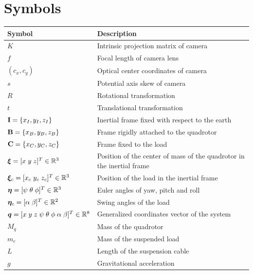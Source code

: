 \chapter*{Symbols}

\begin{table}[H]
    \centering
    \begin{tabular}{@{}p{}p{}@{}}
        \hline
        \textbf{Symbol} & \textbf{Description} \\
        \hline
        $K$ & Intrinsic projection matrix of camera \\
        $f$ & Focal length of camera lens \\
        $(c_x, c_y)$ & Optical center coordinates of camera \\
        $s$ & Potential axis skew of camera \\
        $R$ & Rotational transformation \\
        $t$ & Translational transformation \\       
        $\mathbf{I} = \{x_I, y_I, z_I\}$ & Inertial frame fixed with respect to the earth \\
        $\mathbf{B} = \{x_B, y_B, z_B\}$ & Frame rigidly attached to the quadrotor \\
        $\mathbf{C} = \{x_C, y_C, z_C\}$ & Frame fixed to the load \\
        $\boldsymbol{\xi} = [x \; y \; z]^T \in \mathbb{R}^3$ & Position of the center of mass of the quadrotor in the inertial frame \\
        $\boldsymbol{\xi}_c = [x_c \; y_c \; z_c]^T \in \mathbb{R}^3$ & Position of the load in the inertial frame \\
        $\boldsymbol{\eta} = [\psi \; \theta \; \phi]^T \in \mathbb{R}^3$ & Euler angles of yaw, pitch and roll \\
        $\boldsymbol{\eta}_c = [\alpha \; \beta]^T \in \mathbb{R}^2$ & Swing angles of the load \\
        $\boldsymbol{q} = [x \; y \; z \; \psi \; \theta \; \phi \; \alpha \; \beta]^T \in \mathbb{R}^8$ & Generalized coordinates vector of the system \\
        $M_q$ & Mass of the quadrotor \\
        $m_c$ & Mass of the suspended load \\
        $L$ & Length of the suspension cable \\
        $g$ & Gravitational acceleration \\

\end{tabular}
\end{table}
